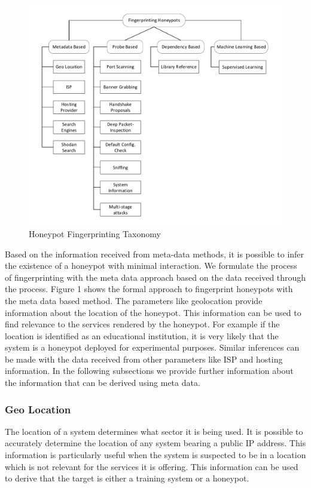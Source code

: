 \documentclass[letterpaper, 10 pt, conference]{ieeeconf}  %
\begin{document}
\begin{figure}
    \centering
    \includegraphics[scale=0.5]{taxonomy}
    \caption{Honeypot Fingerprinting Taxonomy}
    \label{fig:taxonomy}
\end{figure}


Based on the information received from meta-data methods, it is possible to infer the existence of a honeypot with minimal interaction. We formulate the process of fingerprinting with the meta data approach based on the data received through the process. Figure 1 shows the formal approach to fingerprint honeypots with the meta data based method. The parameters like geolocation provide information about the location of the honeypot. This information can be used to find relevance to the services rendered by the honeypot. For example if the location is identified as an educational institution, it is very likely that the system is a honeypot deployed for experimental purposes. Similar inferences can be made with the data received from other parameters like ISP and hosting information. In the following subsections we provide further information about the information that can be derived using meta data. 
\newline
\subsubsection{Geo Location}
The location of a system determines what sector it is being used. It is possible to accurately determine the location of any system bearing a public IP address. This information is particularly useful when the system is suspected to be in a location which is not relevant for the services it is offering. This information can be used to derive that the target is either a training system or a honeypot. 
\newline
\end{document}

